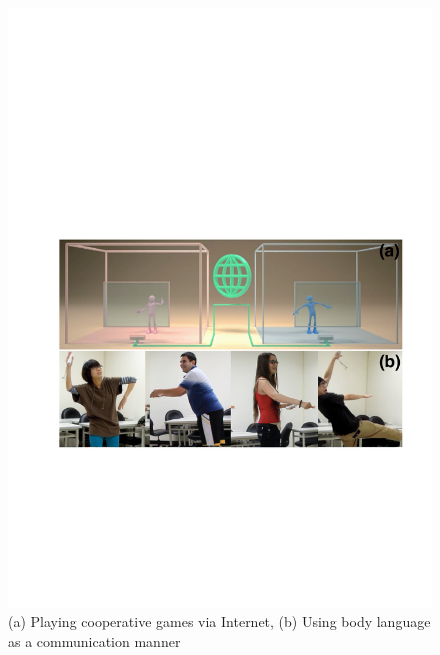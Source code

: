 \begin{figure}[t]
\centering
\includegraphics[width=0.9\columnwidth]{Figures/Topic.pdf}
\caption{(a) Playing cooperative games via Internet, (b) Using body language as a communication manner}
\label{fig:Topic}
\end{figure}


